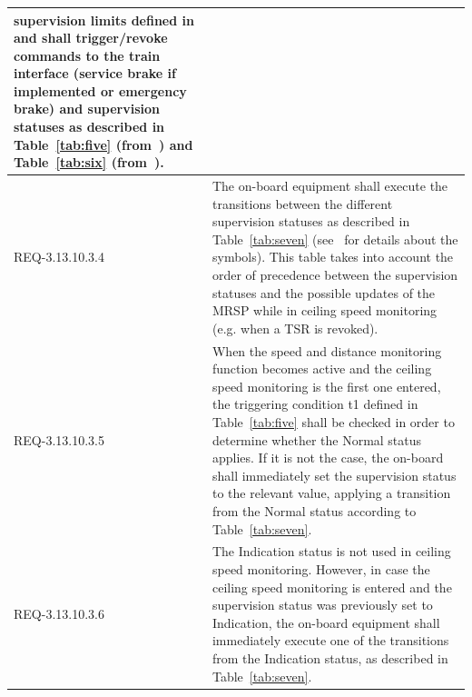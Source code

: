 {\begin{longtable}{lp{}}
supervision limits defined in \cite[3.13.9.2]{ETCSSRS-Principles} and
shall trigger/revoke commands to the train interface (service brake if
implemented or emergency brake) and supervision statuses as described
in Table~\ref{tab:five} (from~\cite[Table~5]{ETCSSRS-Principles}) and
Table~\ref{tab:six} (from~\cite[Table~6]{ETCSSRS-Principles}).
\\\hline
REQ-3.13.10.3.4&
The on-board equipment shall execute the transitions between the different supervision statuses as described in Table~\ref{tab:seven} (see~\cite[4.6.1]{ETCSSRS-Principles} for details about the symbols). This table takes into account the order of precedence between the supervision statuses and the possible updates of the MRSP while in ceiling speed monitoring (e.g. when a TSR is revoked).
\\\hline
REQ-3.13.10.3.5&
When the speed and distance monitoring function becomes active and the ceiling speed monitoring is the first one entered, the triggering condition t1 defined in Table~\ref{tab:five} shall be checked in order to determine whether the Normal status applies. If it is not the case, the on-board shall immediately set the supervision status to the relevant value, applying a transition from the Normal status according to Table~\ref{tab:seven}.
\\\hline
REQ-3.13.10.3.6&
The Indication status is not used in ceiling speed monitoring. However, in case the ceiling speed monitoring is entered and the supervision status was previously set to Indication, the on-board equipment shall immediately execute one of the transitions from the Indication status, as described in Table~\ref{tab:seven}.
\\
\hline\hline
\end{longtable}
}
 
